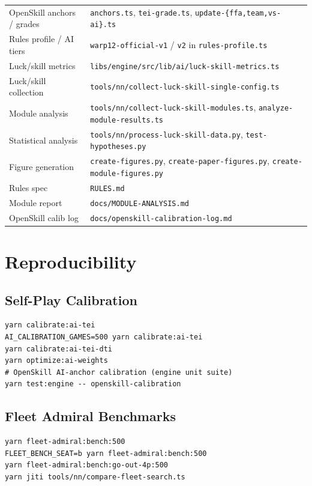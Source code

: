 \documentclass[11pt,letterpaper]{article}
\begin{document}
\begin{table}[h]
\begin{tabular}{@{}ll@{}}
OpenSkill anchors / grades & \texttt{anchors.ts}, \texttt{tei-grade.ts}, \texttt{update-\{ffa,team,vs-ai\}.ts} \\
Rules profile / AI tiers & \texttt{warp12-official-v1} / \texttt{v2} in \texttt{rules-profile.ts} \\
Luck/skill metrics & \texttt{libs/engine/src/lib/ai/luck-skill-metrics.ts} \\
Luck/skill collection & \texttt{tools/nn/collect-luck-skill-single-config.ts} \\
Module analysis & \texttt{tools/nn/collect-luck-skill-modules.ts}, \texttt{analyze-module-results.ts} \\
Statistical analysis & \texttt{tools/nn/process-luck-skill-data.py}, \texttt{test-hypotheses.py} \\
Figure generation & \texttt{create-figures.py}, \texttt{create-paper-figures.py}, \texttt{create-module-figures.py} \\
Rules spec & \texttt{RULES.md} \\
Module report & \texttt{docs/MODULE-ANALYSIS.md} \\
OpenSkill calib log & \texttt{docs/openskill-calibration-log.md} \\
\bottomrule
\end{tabular}
\end{table}

\section{Reproducibility}

\subsection{Self-Play Calibration}
\begin{verbatim}
yarn calibrate:ai-tei
AI_CALIBRATION_GAMES=500 yarn calibrate:ai-tei
yarn calibrate:ai-tei-dti
yarn optimize:ai-weights
# OpenSkill AI-anchor calibration (engine unit suite)
yarn test:engine -- openskill-calibration
\end{verbatim}

\subsection{Fleet Admiral Benchmarks}
\begin{verbatim}
yarn fleet-admiral:bench:500
FLEET_BENCH_SEAT=b yarn fleet-admiral:bench:500
yarn fleet-admiral:bench:go-out-4p:500
yarn jiti tools/nn/compare-fleet-search.ts
\end{verbatim}
\end{document}
